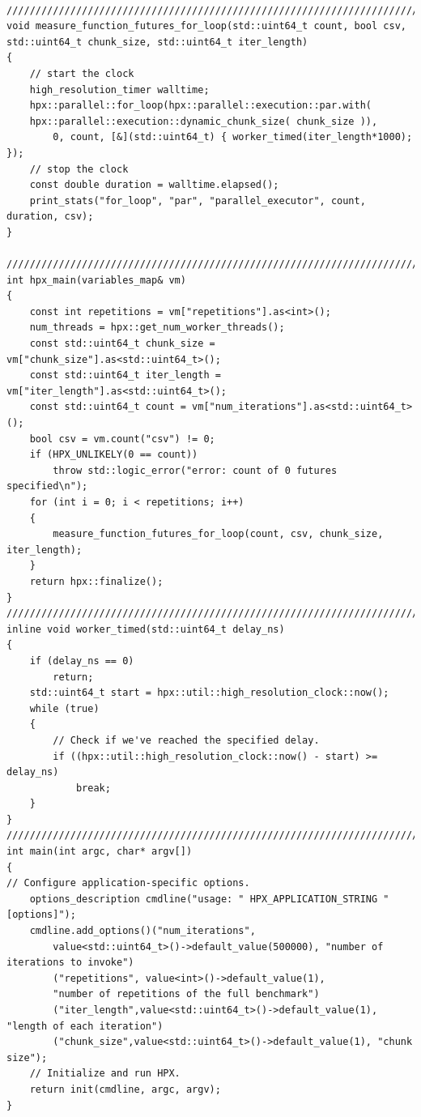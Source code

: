 \begin{lstlisting}[basicstyle=\fontsize{8}{9}\selectfont,float,floatplacement=H,caption= {For-loop benchmark, a simple hpx for\textunderscore{loop} used to study the effect of grain size on the achieved parallelism.}, label={hpx_for_loop}]

///////////////////////////////////////////////////////////////////////////////
void measure_function_futures_for_loop(std::uint64_t count, bool csv, std::uint64_t chunk_size, std::uint64_t iter_length)
{
	// start the clock
	high_resolution_timer walltime;
	hpx::parallel::for_loop(hpx::parallel::execution::par.with(
	hpx::parallel::execution::dynamic_chunk_size( chunk_size )),
		0, count, [&](std::uint64_t) { worker_timed(iter_length*1000); });
	// stop the clock
	const double duration = walltime.elapsed();
	print_stats("for_loop", "par", "parallel_executor", count, duration, csv);
}

///////////////////////////////////////////////////////////////////////////////
int hpx_main(variables_map& vm)
{	
	const int repetitions = vm["repetitions"].as<int>();
	num_threads = hpx::get_num_worker_threads();
	const std::uint64_t chunk_size = vm["chunk_size"].as<std::uint64_t>();
	const std::uint64_t iter_length = vm["iter_length"].as<std::uint64_t>();
	const std::uint64_t count = vm["num_iterations"].as<std::uint64_t>();
	bool csv = vm.count("csv") != 0;
	if (HPX_UNLIKELY(0 == count))
		throw std::logic_error("error: count of 0 futures specified\n");
	for (int i = 0; i < repetitions; i++)
	{
		measure_function_futures_for_loop(count, csv, chunk_size, iter_length);
	}	
	return hpx::finalize();
}
///////////////////////////////////////////////////////////////////////////////
inline void worker_timed(std::uint64_t delay_ns)
{
	if (delay_ns == 0)
		return;
	std::uint64_t start = hpx::util::high_resolution_clock::now();
	while (true)
	{
		// Check if we've reached the specified delay.
		if ((hpx::util::high_resolution_clock::now() - start) >= delay_ns)
			break;
	}
}
///////////////////////////////////////////////////////////////////////////////
int main(int argc, char* argv[])
{
// Configure application-specific options.
	options_description cmdline("usage: " HPX_APPLICATION_STRING " [options]");
	cmdline.add_options()("num_iterations",
		value<std::uint64_t>()->default_value(500000), "number of iterations to invoke")
		("repetitions", value<int>()->default_value(1),
		"number of repetitions of the full benchmark")
		("iter_length",value<std::uint64_t>()->default_value(1), "length of each iteration")
		("chunk_size",value<std::uint64_t>()->default_value(1), "chunk size");
	// Initialize and run HPX.
	return init(cmdline, argc, argv);
}
\end{lstlisting}

